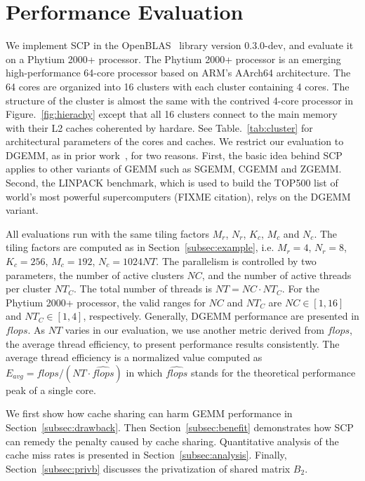 \section{Performance Evaluation}\label{sec:evaluation}

We implement SCP in the OpenBLAS~\cite{openblas} library version 0.3.0-dev,
and evaluate it on a Phytium 2000+ processor.
The Phytium 2000+ processor is an emerging high-performance
64-core processor based on ARM's AArch64 architecture.
The 64 cores are organized into 16 clusters with each
cluster containing 4 cores.
The structure of the cluster is almost the same with
the contrived 4-core processor in Figure.~\ref{fig:hierachy}
except that all 16 clusters connect to the main memory
with their L2 caches coherented by hardare.
See Table.~\ref{tab:cluster} for architectural parameters of the cores and caches.
We restrict our evaluation to DGEMM,
as in prior work~\cite{blispar,augem,poetmicro}, for two reasons.
First, the basic idea behind SCP applies to other
variants of GEMM such as SGEMM, CGEMM and ZGEMM.
Second, the LINPACK benchmark, which is used to build the
TOP500 list of world's most powerful supercomputers (FIXME citation),
relys on the DGEMM variant.

All evaluations run with the same tiling factors
$M_r$, $N_r$, $K_c$, $M_c$ and $N_c$.
The tiling factors are computed as in Section~\ref{subsec:example},
i.e. $M_r = 4$, $N_r = 8$, $K_c = 256$, $M_c = 192$, $N_c = 1024NT$.
The parallelism is controlled by two parameters,
the number of active clusters $NC$,
and the number of active threads per cluster $NT_C$.
The total number of threads is $NT = NC \cdot NT_C$.
For the Phytium 2000+ processor, the valid ranges for $NC$ and $NT_C$
are $NC \in [1, 16]$ and $NT_C \in [1, 4]$, respectively.
Generally, DGEMM performance are presented in $flops$.
As $NT$ varies in our evaluation,
we use another metric derived from $flops$,
the average thread efficiency,
to present performance results consistently.
The average thread efficiency is a normalized value computed as
$E_{avg} = flops / (NT \cdot \widehat{flops})$
in which $\widehat{flops}$ stands for the theoretical performance peak of a single core.

We first show how cache sharing can harm GEMM performance
in Section~\ref{subsec:drawback}.
Then Section~\ref{subsec:benefit} demonstrates how SCP can remedy
the penalty caused by cache sharing.
Quantitative analysis of the cache miss rates
is presented in Section~\ref{subsec:analysis}.
Finally, Section~\ref{subsec:privb} discusses
the privatization of shared matrix $B_2$.

